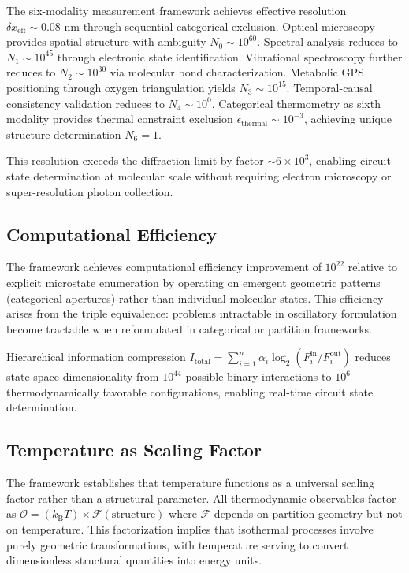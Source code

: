 \documentclass[12pt,a4paper]{article}
\theoremstyle{plain}
\theoremstyle{definition}
\theoremstyle{remark}
\newcommand{\kB}{k_{\mathrm{B}}}
\begin{document}
The six-modality measurement framework achieves effective resolution $\delta x_{\text{eff}} \sim 0.08$ nm through sequential categorical exclusion. Optical microscopy provides spatial structure with ambiguity $N_0 \sim 10^{60}$. Spectral analysis reduces to $N_1 \sim 10^{45}$ through electronic state identification. Vibrational spectroscopy further reduces to $N_2 \sim 10^{30}$ via molecular bond characterization. Metabolic GPS positioning through oxygen triangulation yields $N_3 \sim 10^{15}$. Temporal-causal consistency validation reduces to $N_4 \sim 10^{0}$. Categorical thermometry as sixth modality provides thermal constraint exclusion $\epsilon_{\text{thermal}} \sim 10^{-3}$, achieving unique structure determination $N_6 = 1$.

This resolution exceeds the diffraction limit by factor $\sim 6 \times 10^3$, enabling circuit state determination at molecular scale without requiring electron microscopy or super-resolution photon collection.

\subsection{Computational Efficiency}

The framework achieves computational efficiency improvement of $10^{22}$ relative to explicit microstate enumeration by operating on emergent geometric patterns (categorical apertures) rather than individual molecular states. This efficiency arises from the triple equivalence: problems intractable in oscillatory formulation become tractable when reformulated in categorical or partition frameworks.

Hierarchical information compression $I_{\text{total}} = \sum_{i=1}^n \alpha_i \log_2(F_i^{\text{in}}/F_i^{\text{out}})$ reduces state space dimensionality from $10^{44}$ possible binary interactions to $10^{6}$ thermodynamically favorable configurations, enabling real-time circuit state determination.

\subsection{Temperature as Scaling Factor}

The framework establishes that temperature functions as a universal scaling factor rather than a structural parameter. All thermodynamic observables factor as $\mathcal{O} = (\kB T) \times \mathcal{F}(\text{structure})$ where $\mathcal{F}$ depends on partition geometry but not on temperature. This factorization implies that isothermal processes involve purely geometric transformations, with temperature serving to convert dimensionless structural quantities into energy units.
\end{document}
